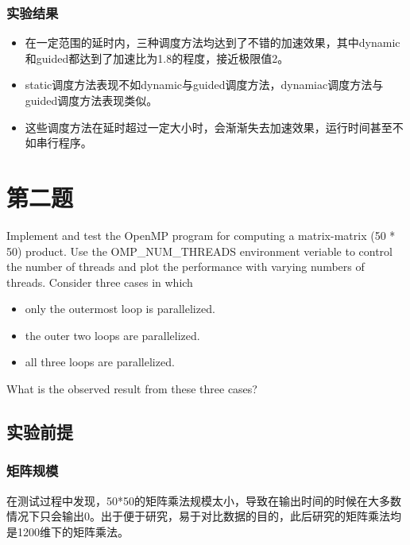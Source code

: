 \documentclass[forprint]{myreport}
\begin{document}
\subsection{实验结果}

\begin{itemize}
    \item 在一定范围的延时内，三种调度方法均达到了不错的加速效果，其中dynamic和guided都达到了加速比为1.8的程度，接近极限值2。
    \item static调度方法表现不如dynamic与guided调度方法，dynamiac调度方法与guided调度方法表现类似。
    \item 这些调度方法在延时超过一定大小时，会渐渐失去加速效果，运行时间甚至不如串行程序。
\end{itemize}

\chapter{第二题}

\begin{tcolorbox}[title = {第二题}]
Implement and test the OpenMP program for computing a matrix-matrix (50 * 50) product. Use the OMP\_NUM\_THREADS environment veriable to control the number of threads and plot the performance with varying numbers of threads. Consider three cases in which
\begin{itemize}
    \item only the outermost loop is parallelized.
    \item the outer two loops are parallelized.
    \item all three loops are parallelized.
\end{itemize}
What is the observed result from these three cases?
\end{tcolorbox}

\section{实验前提}


\subsection{矩阵规模}

在测试过程中发现，50*50的矩阵乘法规模太小，导致在输出时间的时候在大多数情况下只会输出0。出于便于研究，易于对比数据的目的，此后研究的矩阵乘法均是1200维下的矩阵乘法。
\end{document}
